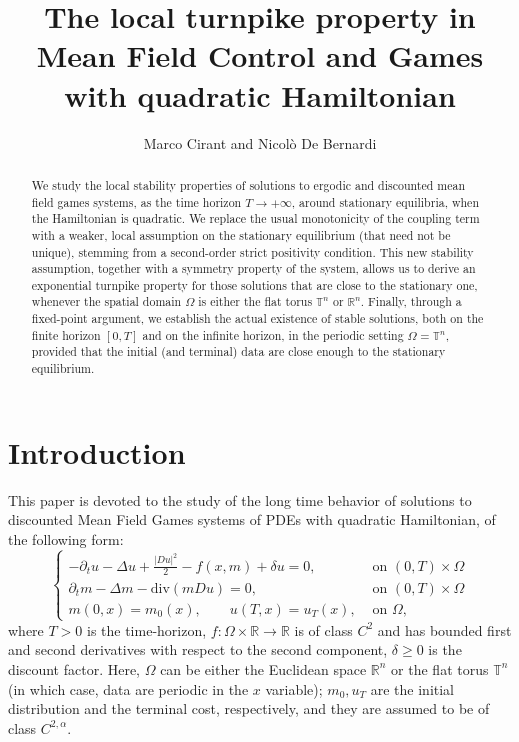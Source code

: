 \documentclass[10pt,a4paper,nouppercase,nowrite]{article}
\title{The local turnpike property in Mean Field Control and Games with quadratic Hamiltonian}
\author{Marco Cirant and Nicol\`o De Bernardi}
\date{}
\numberwithin{equation}{section}
\newcommand{\R}{\mathbb{R}}
\newcommand{\T}{\mathbb{T}}
\theoremstyle{definition}
\begin{document}
	\maketitle
	
	\begin{abstract} 
		We study the local stability properties of solutions to ergodic and discounted mean field games systems, as the time horizon $T \to +\infty$, around stationary equilibria, when the Hamiltonian is quadratic. We replace the usual monotonicity of the coupling term with a weaker, local assumption on the stationary equilibrium (that need not be unique), stemming from a second-order strict positivity condition. This new stability assumption, together with a symmetry property of the system, allows us to derive an exponential turnpike property for those solutions that are close to the stationary one, whenever the spatial domain $\Omega$ is either the flat torus $\T^n$ or $\R^n$. Finally, through a fixed-point argument, we establish the actual existence of stable solutions, both on the finite horizon $[0,T]$ and on the infinite horizon, in the periodic setting $\Omega=\T^n$, provided that the initial (and terminal) data are close enough to the stationary equilibrium.
         \end{abstract}
         
	\tableofcontents
		
		\section{Introduction}
	This paper is devoted to the study of the long time behavior of solutions to discounted Mean Field Games systems of PDEs with quadratic Hamiltonian, of the following form:
	\begin{equation}
		\begin{cases}
			-\partial_t u - \Delta u + \frac{|Du|^2}{2} - f(x,m) + \delta u = 0,& \text{ on } (0,T) \times \Omega \\
			\partial_t m - \Delta m - \text{div}(m Du)=0,& \text{ on } (0,T) \times \Omega \\
			m(0,x)=m_0(x), \qquad u(T,x)=u_T(x),& \text{ on } \Omega,
		\end{cases}
		\label{dynsys}
	\end{equation}
	where $T > 0$ is the time-horizon, $f : \Omega \times \R \to \R$ is of class $C^2$ and has bounded first and second derivatives with respect to the second component, $\delta \geq 0$ is the discount factor. Here, $\Omega$ can be either the Euclidean space $\R^n$ or the flat torus $\T^n$ (in which case, data are periodic in the $x$ variable); $m_0, u_T$ are the initial distribution and the terminal cost, respectively, and they are assumed to be of class $C^{2,\alpha}$.
	
\end{document}
